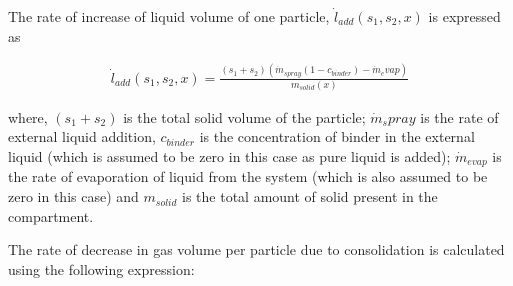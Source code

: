 \documentclass[preprint,11pt,authoryear]{elsarticle}
\begin{document}


%	
%	    
%	    

\par The rate of increase of liquid volume of one particle, $\dot{l}_{add}(s_1,s_2,x)$ is expressed as

\begin{align}
\dot{l}_{add}(s_1,s_2,x) = \frac{(s_1+s_2)(\dot{m}_{spray}(1-c_{binder})-\dot{m}_evap)}{m_{solid}(x)}
\end{align}

where, $(s_1+s_2)$  is the total solid volume of the particle; $\dot{m}_spray$ is the rate of external liquid addition, $c_{binder}$ is the concentration of binder in the external liquid (which is assumed to be zero in this case as pure liquid is added); $\dot{m}_{evap}$ is the rate of evaporation of liquid from the system (which is also assumed to be zero in this case) and $m_{solid}$ is the total amount of solid present in the compartment.
\par The rate of decrease in gas volume per particle due to consolidation is calculated using the following expression: 
\end{document}
